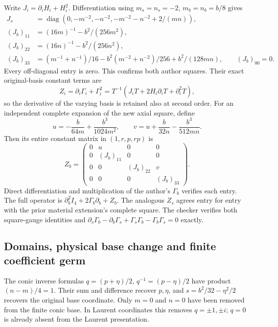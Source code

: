 Write $J_i=\partial_iH_i+H_i^2$. Differentiation using
$m_s=n_s=-2$, $m_b=n_b=b/8$ gives
\begin{align*}
 J_s&=\operatorname{diag}(0,-m^{-2},-n^{-2},
                   -m^{-2}-n^{-2}+2/(mn)),\\
 (J_b)_{11}&=(16m)^{-1}-b^2/(256m^2),\\
 (J_b)_{22}&=(16n)^{-1}-b^2/(256n^2),\\
 (J_b)_{33}&=(m^{-1}+n^{-1})/16
       -b^2(m^{-2}+n^{-2})/256+b^2/(128mn),
 \qquad(J_b)_{00}=0.
\end{align*}
Every off-diagonal entry is zero. This confirms both author squares.
Their exact original-basis constant terms are
\[
 Z_i=\partial_i\Gamma_i+\Gamma_i^2
     =T^{-1}(J_iT+2H_i\partial_iT+\partial_i^2T),
\]
so the derivative of the varying basis is retained also at second order.
For an independent complete expansion of the new axial square, define
\[
 u=-\frac b{64m}+\frac{b^3}{1024m^2},\qquad
 v=u+\frac b{32n}-\frac{b^3}{512mn}.
\]
Then its entire constant matrix in $(1,r,p,rp)$ is
\[
 Z_b=\begin{pmatrix}
 0&u&0&0\\0&(J_b)_{11}&0&0\\
 0&0&(J_b)_{22}&v\\0&0&0&(J_b)_{33}
 \end{pmatrix}.
\]
Direct differentiation and multiplication of the author's
$\Gamma_b$ verifies each entry. The full operator is
$\partial_b^2I_4+2\Gamma_b\partial_b+Z_b$.
The analogous $Z_s$ agrees entry for entry with the prior material
extension's complete square. The checker verifies both square-gauge
identities and
$\partial_s\Gamma_b-\partial_b\Gamma_s+
\Gamma_s\Gamma_b-\Gamma_b\Gamma_s=0$ exactly.

\subsection*{Domains, physical base change and finite coefficient germ}

The conic inverse formulas $q=(p+\eta)/2$,
$q^{-1}=(p-\eta)/2$ have product $(n-m)/4=1$.
Their sum and difference recover $p,\eta$, and
$s=b^2/32-\eta^2/2$ recovers the original base coordinate.
Only $m=0$ and $n=0$ have been removed from the finite conic
base. In Laurent coordinates this removes $q=\pm1,\pm i$;
$q=0$ is already absent from the Laurent presentation.

